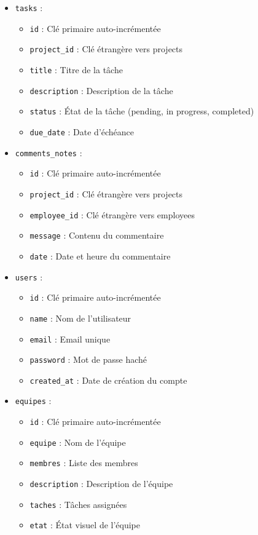 \documentclass[12pt,a4paper]{article}
\begin{document}
\begin{itemize}
    \item \texttt{tasks} :
    \begin{itemize}
        \item \texttt{id} : Clé primaire auto-incrémentée
        \item \texttt{project\_id} : Clé étrangère vers projects
        \item \texttt{title} : Titre de la tâche
        \item \texttt{description} : Description de la tâche
        \item \texttt{status} : État de la tâche (pending, in progress, completed)
        \item \texttt{due\_date} : Date d'échéance
    \end{itemize}

    \item \texttt{comments\_notes} :
    \begin{itemize}
        \item \texttt{id} : Clé primaire auto-incrémentée
        \item \texttt{project\_id} : Clé étrangère vers projects
        \item \texttt{employee\_id} : Clé étrangère vers employees
        \item \texttt{message} : Contenu du commentaire
        \item \texttt{date} : Date et heure du commentaire
    \end{itemize}

    \item \texttt{users} :
    \begin{itemize}
        \item \texttt{id} : Clé primaire auto-incrémentée
        \item \texttt{name} : Nom de l'utilisateur
        \item \texttt{email} : Email unique
        \item \texttt{password} : Mot de passe haché
        \item \texttt{created\_at} : Date de création du compte
    \end{itemize}

    \item \texttt{equipes} :
    \begin{itemize}
        \item \texttt{id} : Clé primaire auto-incrémentée
        \item \texttt{equipe} : Nom de l'équipe
        \item \texttt{membres} : Liste des membres
        \item \texttt{description} : Description de l'équipe
        \item \texttt{taches} : Tâches assignées
        \item \texttt{etat} : État visuel de l'équipe
    \end{itemize}
\end{itemize}
\end{document}
